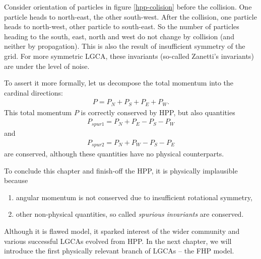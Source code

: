 Consider orientation of particles in figure \ref{hpp-colision} before the collision.
One particle heads to north-east, the other south-west.
After the collision, one particle heads to north-west, other particle to south-east.
So the number of particles heading to the south, east, north and west do not change by collision (and neither by propagation). This is also the result of insufficient symmetry of the grid. For more symmetric LGCA, these invariants (so-called Zanetti's invariants) are under the level of noise.

To assert it more formally, let us decompose the total momentum into the cardinal directions:
\begin{align} 
P = P_N + P_S + P_E + P_W.
\end{align}
This total momentum $P$ is correctly conserved by HPP, but also quantities
\begin{align} \label{zanet}
P_{spur1} = P_N + P_E - P_S - P_W
\end{align}
and
\begin{align}
P_{spur2} = P_N + P_W - P_S - P_E
\end{align}
are conserved, although these quantities have no physical counterparts.

\bigskip

To conclude this chapter and finish-off the HPP, it is physically implausible because
\begin{enumerate}
\item angular momentum is not conserved due to insufficient rotational symmetry,
\item other non-physical quantities, so called \textit{spurious invariants} are conserved.
\end{enumerate}

Although it is flawed model, it sparked interest of the wider community and various successful LGCAs evolved from HPP. In the next chapter, we will introduce the first physically relevant branch of LGCAs -- the FHP model.